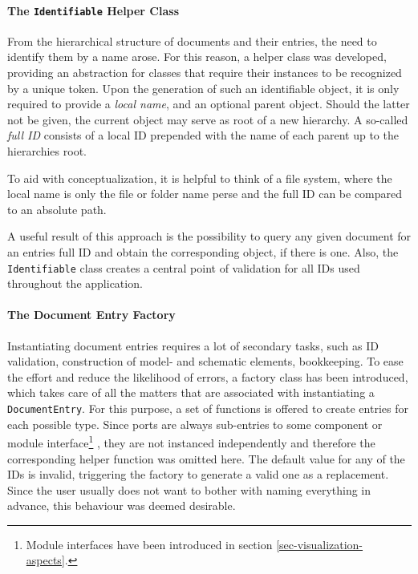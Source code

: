 	\paragraph{The \texttt{Identifiable} Helper Class}
	From the hierarchical structure of documents and their entries, the need to identify them by a name arose.
	For this reason, a helper class was developed, providing an abstraction for classes that require their instances to be recognized by a unique token.
	Upon the generation of such an identifiable object, it is only required to provide a \emph{local name}, and an optional parent object.
	Should the latter not be given, the current object may serve as root of a new hierarchy.
	A so-called \emph{full ID} consists of a local ID prepended with the name of each parent up to the hierarchies root.
	
	To aid with conceptualization, it is helpful to think of a file system, where the local name is only the file or folder name per\-se and the full ID can be compared to an absolute path.
	
	A useful result of this approach is the possibility to query any given document for an entries full ID and obtain the corresponding object, if there is one.
	Also, the \texttt{Identifiable} class creates a central point of validation for all IDs used throughout the application.	
	
	\paragraph{The Document Entry Factory}
	Instantiating document entries requires a lot of secondary tasks, such as ID validation, construction of model- and schematic elements, bookkeeping.
	To ease the effort and reduce the likelihood of errors, a factory class has been introduced, which takes care of all the matters that are associated with instantiating a \texttt{DocumentEntry}.
	For this purpose, a set of functions is offered to create entries for each possible type.
	Since ports are always sub-entries to some component or module interface\footnote{
		Module interfaces have been introduced in section \ref{sec-visualization-aspects}.	
	}
	, they are not instanced independently and therefore the corresponding helper function was omitted here.
	The default value for any of the IDs is invalid, triggering the factory to generate a valid one as a replacement.
	Since the user usually does not want to bother with naming everything in advance, this behaviour was deemed desirable.
	
	